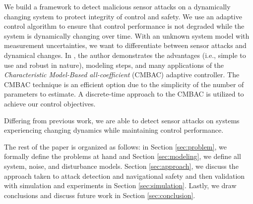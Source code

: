 We build a framework to detect malicious sensor attacks on a dynamically changing system to protect integrity of control and safety. We use an adaptive control algorithm to ensure that control performance is not degraded while the system is dynamically changing over time. With an unknown system model with measurement uncertainties, we want to differentiate between sensor attacks and dynamical changes. In \cite{4106038}, the author demonstrates the advantages (i.e., simple to use and robust in nature), modeling steps, and many applications of the \textit{Characteristic Model-Based all-coefficient} (CMBAC) adaptive controller. The CMBAC technique is an efficient option due to the simplicity of the number of parameters to estimate. A discrete-time approach to the CMBAC is utilized to achieve our control objectives.

Differing from previous work, we are able to detect sensor attacks on systems experiencing changing dynamics while maintaining control performance.

The rest of the paper is organized as follows: in Section \ref{sec:problem}, we formally define the problems at hand and Section \ref{sec:modeling}, we define all system, noise, and disturbance models. Section \ref{sec:approach}, we discuss the approach taken to attack detection and navigational safety and then validation with simulation and experiments in Section \ref{sec:simulation}. Lastly, we draw conclusions and discuss future work in Section \ref{sec:conclusion}.



